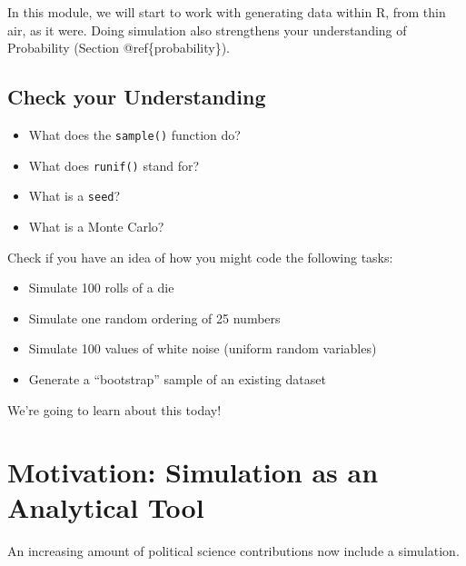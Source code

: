 \documentclass[]{book}
\providecommand{\tightlist}{%
  \setlength{\itemsep}{0pt}\setlength{\parskip}{0pt}}
\theoremstyle{definition}
\theoremstyle{definition}
\theoremstyle{definition}
\theoremstyle{remark}
\begin{document}
In this module, we will start to work with generating data within R,
from thin air, as it were. Doing simulation also strengthens your
understanding of Probability (Section @ref\{probability\}).

\subsection*{Check your Understanding}\label{check-your-understanding-2}

\begin{itemize}
\tightlist
\item
  What does the \texttt{sample()} function do?
\item
  What does \texttt{runif()} stand for?
\item
  What is a \texttt{seed}?
\item
  What is a Monte Carlo?
\end{itemize}

Check if you have an idea of how you might code the following tasks:

\begin{itemize}
\tightlist
\item
  Simulate 100 rolls of a die
\item
  Simulate one random ordering of 25 numbers
\item
  Simulate 100 values of white noise (uniform random variables)
\item
  Generate a ``bootstrap'' sample of an existing dataset
\end{itemize}

We're going to learn about this today!

\section{Motivation: Simulation as an Analytical
Tool}\label{motivation-simulation-as-an-analytical-tool}

An increasing amount of political science contributions now include a
simulation.
\end{document}
